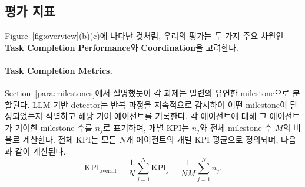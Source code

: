 
\subsection{평가 지표}
\label{sec:eval_metrics}
Figure~\ref{fig:overview}(b)(c)에 나타난 것처럼, 우리의 평가는 두 가지 주요 차원인 \textbf{Task Completion Performance}와 \textbf{Coordination}을 고려한다.

\paragraph{Task Completion Metrics.}

Section~\ref{para:milestones}에서 설명했듯이 각 과제는 일련의 유연한 milestone으로 분할된다. LLM 기반 detector는 반복 과정을 지속적으로 감시하여 어떤 milestone이 달성되었는지 식별하고 해당 기여 에이전트를 기록한다. 각 에이전트에 대해 그 에이전트가 기여한 milestone 수를 \(n_j\)로 표기하며, 개별 KPI는 \(n_j\)와 전체 milestone 수 \(M\)의 비율로 계산한다. 전체 KPI는 모든 \(N\)개 에이전트의 개별 KPI 평균으로 정의되며, 다음과 같이 계산된다.
\[
\text{KPI}_{\text{overall}} = \frac{1}{N}\sum_{j=1}^{N}\text{KPI}_j = \frac{1}{NM}\sum_{j=1}^{N} n_j.
\]

